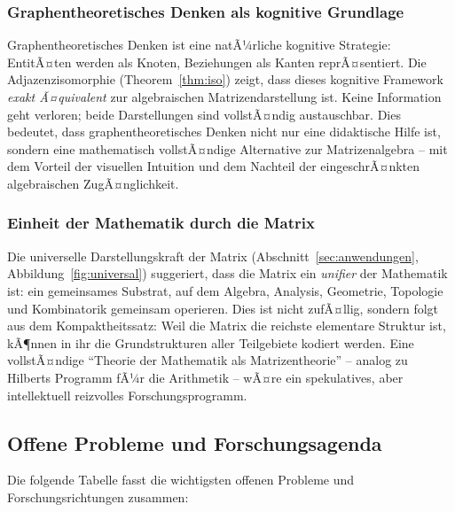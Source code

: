﻿\documentclass[12pt, a4paper]{article}
\theoremstyle{definition}
\theoremstyle{remark}
\begin{document}
\subsubsection*{Graphentheoretisches Denken als kognitive Grundlage}

Graphentheoretisches Denken ist eine natÃ¼rliche kognitive Strategie:
EntitÃ¤ten werden als Knoten, Beziehungen als Kanten reprÃ¤sentiert.
Die Adjazenzisomorphie (Theorem~\ref{thm:iso}) zeigt, dass dieses
kognitive Framework \emph{exakt Ã¤quivalent} zur algebraischen
Matrizendarstellung ist. Keine Information geht verloren; beide
Darstellungen sind vollstÃ¤ndig austauschbar. Dies bedeutet, dass
graphentheoretisches Denken nicht nur eine didaktische Hilfe ist,
sondern eine mathematisch vollstÃ¤ndige Alternative zur
Matrizenalgebra -- mit dem Vorteil der visuellen Intuition und dem
Nachteil der eingeschrÃ¤nkten algebraischen ZugÃ¤nglichkeit.

\subsubsection*{Einheit der Mathematik durch die Matrix}

Die universelle Darstellungskraft der Matrix (Abschnitt~\ref{sec:anwendungen},
Abbildung~\ref{fig:universal}) suggeriert, dass die Matrix ein
\emph{unifier} der Mathematik ist: ein gemeinsames Substrat, auf dem
Algebra, Analysis, Geometrie, Topologie und Kombinatorik gemeinsam
operieren. Dies ist nicht zufÃ¤llig, sondern folgt aus dem Kompaktheitssatz:
Weil die Matrix die reichste elementare Struktur ist, kÃ¶nnen in ihr
die Grundstrukturen aller Teilgebiete kodiert werden. Eine vollstÃ¤ndige
``Theorie der Mathematik als Matrizentheorie'' -- analog zu Hilberts
Programm fÃ¼r die Arithmetik -- wÃ¤re ein spekulatives, aber
intellektuell reizvolles Forschungsprogramm.

\subsection{Offene Probleme und Forschungsagenda}
\label{subsec:agenda}

Die folgende Tabelle fasst die wichtigsten offenen Probleme und
Forschungsrichtungen zusammen:
\end{document}
